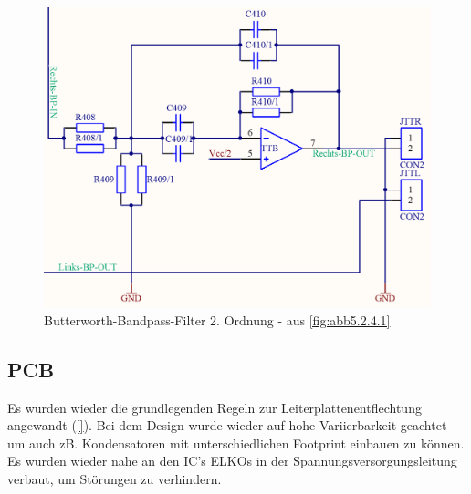 \begin{figure} [ht]
	\centering	
	\includegraphics[width=1\textwidth]{img/Print4/4_TTuHTWeiche-RechtsBP-Schematic.PNG}
	\caption{Butterworth-Bandpass-Filter 2. Ordnung - aus \ref{fig:abb5.2.4.1}}
	\label {fig:abb5.2.4.3}
\end{figure}

\subsection{PCB}\label{kap:5.2.5}
Es wurden wieder die grundlegenden Regeln zur Leiterplattenentflechtung angewandt (\ref{}). Bei dem Design wurde wieder auf hohe Variierbarkeit geachtet um auch zB. Kondensatoren mit unterschiedlichen Footprint einbauen zu können. Es wurden wieder nahe an den IC's ELKOs in der Spannungsversorgungsleitung verbaut, um Störungen zu verhindern.


